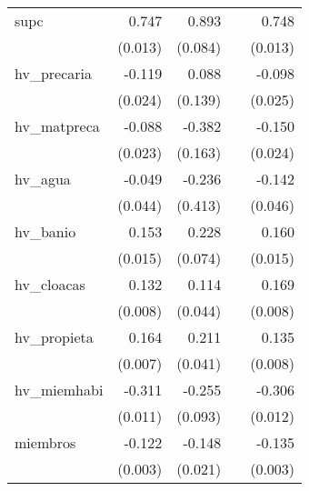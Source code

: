 {\begin{longtable}{l*{4}{D{.}{.}{-1}}}
\addlinespace
supc        &       0.747\sym{***}&       0.893\sym{***}&                     &       0.748\sym{***}\\
            &     (0.013)         &     (0.084)         &                     &     (0.013)         \\
\addlinespace
hv\_precaria &      -0.119\sym{***}&       0.088         &                     &      -0.098\sym{***}\\
            &     (0.024)         &     (0.139)         &                     &     (0.025)         \\
\addlinespace
hv\_matpreca &      -0.088\sym{***}&      -0.382\sym{*}  &                     &      -0.150\sym{***}\\
            &     (0.023)         &     (0.163)         &                     &     (0.024)         \\
\addlinespace
hv\_agua     &      -0.049         &      -0.236         &                     &      -0.142\sym{**} \\
            &     (0.044)         &     (0.413)         &                     &     (0.046)         \\
\addlinespace
hv\_banio    &       0.153\sym{***}&       0.228\sym{**} &                     &       0.160\sym{***}\\
            &     (0.015)         &     (0.074)         &                     &     (0.015)         \\
\addlinespace
hv\_cloacas  &       0.132\sym{***}&       0.114\sym{**} &                     &       0.169\sym{***}\\
            &     (0.008)         &     (0.044)         &                     &     (0.008)         \\
\addlinespace
hv\_propieta &       0.164\sym{***}&       0.211\sym{***}&                     &       0.135\sym{***}\\
            &     (0.007)         &     (0.041)         &                     &     (0.008)         \\
\addlinespace
hv\_miemhabi &      -0.311\sym{***}&      -0.255\sym{**} &                     &      -0.306\sym{***}\\
            &     (0.011)         &     (0.093)         &                     &     (0.012)         \\
\addlinespace
miembros    &      -0.122\sym{***}&      -0.148\sym{***}&                     &      -0.135\sym{***}\\
            &     (0.003)         &     (0.021)         &                     &     (0.003)         \\

\end{longtable}}

